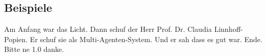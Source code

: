 


\subsection{Beispiele}
\label{sec:comparison_examples}
Am Anfang war das Licht. Dann schuf der Herr Prof. Dr. Claudia Linnhoff-Popien. Er schuf sie als Multi-Agenten-System.
Und er sah dass es gut war.
Ende.
Bitte ne 1.0 danke.

